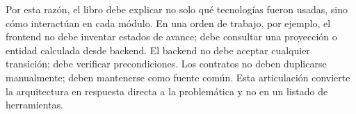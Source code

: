 Por esta razón, el libro debe explicar no solo qué tecnologías fueron usadas, sino cómo interactúan en cada módulo. En una orden de trabajo, por ejemplo, el frontend no debe inventar estados de avance; debe consultar una proyección o entidad calculada desde backend. El backend no debe aceptar cualquier transición; debe verificar precondiciones. Los contratos no deben duplicarse manualmente; deben mantenerse como fuente común. Esta articulación convierte la arquitectura en respuesta directa a la problemática y no en un listado de herramientas.
